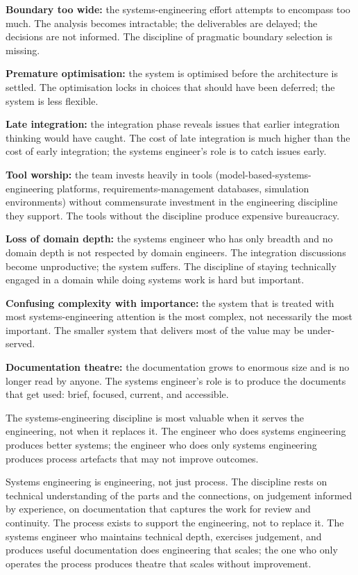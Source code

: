 \textbf{Boundary too wide:} the systems-engineering effort attempts to encompass too much. The analysis becomes intractable; the deliverables are delayed; the decisions are not informed. The discipline of pragmatic boundary selection is missing.

\textbf{Premature optimisation:} the system is optimised before the architecture is settled. The optimisation locks in choices that should have been deferred; the system is less flexible.

\textbf{Late integration:} the integration phase reveals issues that earlier integration thinking would have caught. The cost of late integration is much higher than the cost of early integration; the systems engineer's role is to catch issues early.

\textbf{Tool worship:} the team invests heavily in tools (model-based-systems-engineering platforms, requirements-management databases, simulation environments) without commensurate investment in the engineering discipline they support. The tools without the discipline produce expensive bureaucracy.

\textbf{Loss of domain depth:} the systems engineer who has only breadth and no domain depth is not respected by domain engineers. The integration discussions become unproductive; the system suffers. The discipline of staying technically engaged in a domain while doing systems work is hard but important.

\textbf{Confusing complexity with importance:} the system that is treated with most systems-engineering attention is the most complex, not necessarily the most important. The smaller system that delivers most of the value may be under-served.

\textbf{Documentation theatre:} the documentation grows to enormous size and is no longer read by anyone. The systems engineer's role is to produce the documents that get used: brief, focused, current, and accessible.

The systems-engineering discipline is most valuable when it serves the engineering, not when it replaces it. The engineer who does systems engineering produces better systems; the engineer who does only systems engineering produces process artefacts that may not improve outcomes.

\begin{principle}
Systems engineering is engineering, not just process. The discipline rests on technical understanding of the parts and the connections, on judgement informed by experience, on documentation that captures the work for review and continuity. The process exists to support the engineering, not to replace it. The systems engineer who maintains technical depth, exercises judgement, and produces useful documentation does engineering that scales; the one who only operates the process produces theatre that scales without improvement.
\end{principle}

